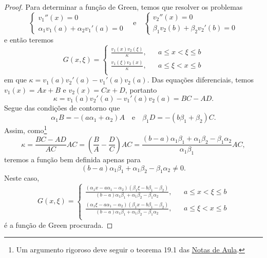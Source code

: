 \begin{proof}
    Para determinar a função de Green, temos que resolver os problemas
    \begin{equation*}
        \begin{cases}
            v_1''(x) = 0\\
            \alpha_1 v_1(a) + \alpha_2 v_1'(a) = 0
        \end{cases}
        \quad\text{e}\quad
        \begin{cases}
            v_2''(x) = 0\\
            \beta_1 v_2(b) + \beta_2 v_2'(b) = 0
        \end{cases}
    \end{equation*}
    e então teremos
    \begin{equation*}
        G(x, \xi) = \left\{\begin{aligned}
                \frac{v_1(x)v_2(\xi)}{\kappa},&& a \leq x < \xi \leq b\\
                \frac{v_1(\xi)v_2(x)}{\kappa},&& a \leq \xi < x \leq b\\
        \end{aligned}\right.
    \end{equation*}
    em que \(\kappa = v_1(a)v_2'(a) - v_1'(a)v_2(a).\) Das equações diferenciais, temos \(v_1(x) = Ax + B\) e \(v_2(x) = Cx + D\), portanto
    \begin{equation*}
        \kappa = v_1(a)v_2'(a) - v_1'(a)v_2(a) = BC - AD.
    \end{equation*}
    Segue das condições de contorno que
    \begin{equation*}
        \alpha_1B = -(a \alpha_1 + \alpha_2)A\quad\text{e}\quad \beta_1 D = -(b \beta_1 + \beta_2)C.
    \end{equation*}
    Assim, como\footnote{Um argumento rigoroso deve seguir o teorema 19.1 das \href{http://denebola.if.usp.br/~jbarata/Notas_de_aula/arquivos/nc-cap19.pdf}{Notas de Aula}.}
    \begin{equation*}
        \kappa = \frac{BC - AD}{AC}AC = \left(\frac{B}{A} - \frac{D}{C}\right)AC = \frac{(b-a)\alpha_1 \beta_1 + \alpha_1 \beta_2 - \beta_1 \alpha_2}{\alpha_1 \beta_1}AC,
    \end{equation*}
    teremos a função bem definida apenas para
    \begin{equation*}
        (b - a)\alpha_1 \beta_1 + \alpha_1 \beta_2 - \beta_1 \alpha_2 \neq 0.
    \end{equation*}
    Neste caso,
    \begin{equation*}
        G(x,\xi) = \left\{\begin{aligned}
            \frac{(\alpha_1 x - a \alpha_1 - \alpha_2)(\beta_1 \xi - b \beta_1 - \beta_2)}{(b - a)\alpha_1 \beta_1 + \alpha_1 \beta_2 - \beta_1 \alpha_2}, && a \leq x < \xi \leq b\\
            \frac{(\alpha_1 \xi - a \alpha_1 - \alpha_2)(\beta_1 x - b \beta_1 - \beta_2)}{(b - a)\alpha_1 \beta_1 + \alpha_1 \beta_2 - \beta_1 \alpha_2}, && a \leq \xi < x \leq b\\
        \end{aligned}\right.
    \end{equation*}
    é a função de Green procurada.
\end{proof}
